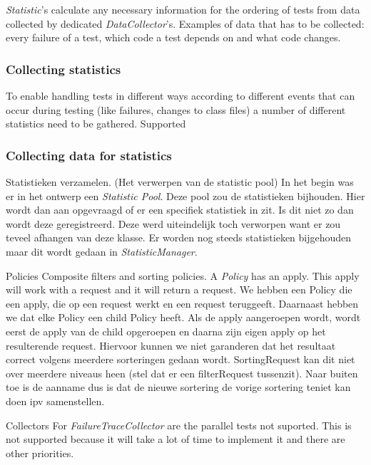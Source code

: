 \documentclass[i2]{oss}
\newcommand{\class}[1]{\emph{#1}}
\begin{document}
\class{Statistic}'s calculate any necessary information for the ordering
of tests from data collected by dedicated \class{DataCollector}'s.
Examples of data that has to be collected: every failure of a test,
which code a test depends on and what code changes.

\subsubsection{Collecting statistics}
To enable handling tests in different ways according to different events 
that can occur during testing (like failures, changes to class files) 
a number of different statistics need to be gathered.
Supported

\subsubsection{Collecting data for statistics}





\begin{description}
\item Statistieken verzamelen. (Het verwerpen van de statistic pool)
In het begin was er in het ontwerp een \textit{Statistic Pool}. Deze pool zou de statistieken bijhouden. Hier wordt dan aan opgevraagd of er een specifiek statistiek in zit. Is dit niet zo dan wordt deze geregistreerd. Deze werd uiteindelijk toch verworpen want er zou teveel afhangen van deze klasse. Er worden nog steeds statistieken bijgehouden maar dit wordt gedaan in \textit{StatisticManager}.

\item Policies
Composite filters and sorting policies.
A \emph{Policy} has an apply. This apply will work with a request and it will return a request.
We hebben een Policy die een apply, die op een request werkt en een request teruggeeft. Daarnaast hebben we dat elke Policy een child Policy heeft. Als de apply aangeroepen wordt, wordt eerst de apply van de child opgeroepen en daarna zijn eigen apply op het resulterende request. Hiervoor kunnen we niet garanderen dat het resultaat correct volgens meerdere sorteringen gedaan wordt. SortingRequest kan dit niet over meerdere niveaus heen (stel dat er een filterRequest tussenzit). Naar buiten toe is de aanname dus is dat de nieuwe sortering de vorige sortering teniet kan doen ipv samenstellen.

\item Collectors
For \emph{FailureTraceCollector} are the parallel tests not suported. This is not supported because it will take a lot of time to implement it and there are other priorities.
\end{description}
\end{document}
